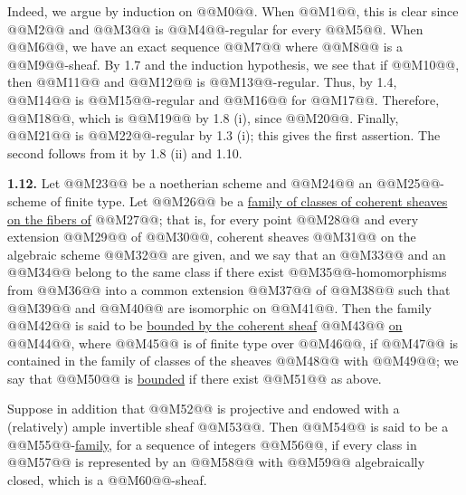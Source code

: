 Indeed, we argue by induction on @@M0@@. When @@M1@@, this is clear since @@M2@@ and @@M3@@ is @@M4@@-regular for every @@M5@@. When @@M6@@, we have an exact sequence @@M7@@ where @@M8@@ is a @@M9@@-sheaf. By 1.7 and the induction hypothesis, we see that if @@M10@@, then @@M11@@ and @@M12@@ is @@M13@@-regular. Thus, by 1.4, @@M14@@ is @@M15@@-regular and @@M16@@ for @@M17@@. Therefore, @@M18@@, which is @@M19@@ by 1.8 (i), since @@M20@@. Finally, @@M21@@ is @@M22@@-regular by 1.3 (i); this gives the first assertion. The second follows from it by 1.8 (ii) and 1.10.

\textbf{1.12.} Let @@M23@@ be a noetherian scheme and @@M24@@ an @@M25@@-scheme of finite type. Let @@M26@@ be a \uline{family of classes of coherent sheaves on the fibers of} @@M27@@; that is, for every point @@M28@@ and every extension @@M29@@ of @@M30@@, coherent sheaves @@M31@@ on the algebraic scheme @@M32@@ are given, and we say that an @@M33@@ and an @@M34@@ belong to the same class if there exist @@M35@@-homomorphisms from @@M36@@ into a common extension @@M37@@ of @@M38@@ such that @@M39@@ and @@M40@@ are isomorphic on @@M41@@. Then the family @@M42@@ is said to be \uline{bounded by the coherent sheaf} @@M43@@ \uline{on} @@M44@@, where @@M45@@ is of finite type over @@M46@@, if @@M47@@ is contained in the family of classes of the sheaves @@M48@@ with @@M49@@; we say that @@M50@@ is \uline{bounded} if there exist @@M51@@ as above.

Suppose in addition that @@M52@@ is projective and endowed with a (relatively) ample invertible sheaf @@M53@@. Then @@M54@@ is said to be a @@M55@@-\uline{family}, for a sequence of integers @@M56@@, if every class in @@M57@@ is represented by an @@M58@@ with @@M59@@ algebraically closed, which is a @@M60@@-sheaf.

